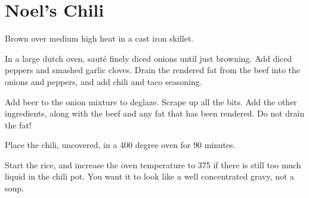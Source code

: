 \section{Noel's Chili}
\begin{recipe}



Brown over medium high heat in a cast iron skillet.


In a large dutch oven, sauté finely diced onions until just browning. Add diced peppers and smashed garlic cloves. Drain the rendered fat from the beef into the onions and peppers, and add chili and taco seasoning.



Add beer to the onion mixture to deglaze. Scrape up all the bits. Add the other ingredients, along with the beef and any fat that has been rendered. Do not drain the fat!

Place the chili, uncovered, in a 400 degree oven for 90 minutes.


Start the rice, and increase the oven temperature to 375 if there is still too much liquid in the chili pot. You want it to look like a well concentrated gravy, not a soup.


\end{recipe}
